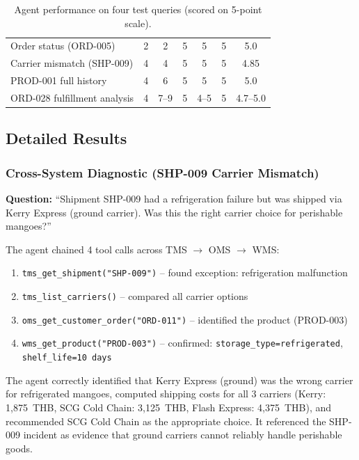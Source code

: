 \documentclass[11pt,a4paper]{article}
\begin{document}
\begin{table}[H]
\centering\small
\caption{Agent performance on four test queries (scored on 5-point scale).}
\begin{tabularx}{\textwidth}{@{} L{3.5cm} c c c c c c @{}}
\toprule
{} &  &  &  &  &  &  \\
\midrule
Order status (ORD-005)              & 2 & 2 & 5 & 5 & 5 & 5.0 \\
Carrier mismatch (SHP-009)          & 4 & 4 & 5 & 5 & 5 & 4.85 \\
PROD-001 full history               & 4 & 6 & 5 & 5 & 5 & 5.0 \\
ORD-028 fulfillment analysis        & 4 & 7--9 & 5 & 4--5 & 5 & 4.7--5.0 \\
\bottomrule
\end{tabularx}
\end{table}

\subsection{Detailed Results}

\subsubsection{Cross-System Diagnostic (SHP-009 Carrier Mismatch)}

\textbf{Question:} ``Shipment SHP-009 had a refrigeration failure but was shipped via Kerry Express (ground carrier). Was this the right carrier choice for perishable mangoes?''

The agent chained 4 tool calls across TMS $\to$ OMS $\to$ WMS:

\begin{enumerate}[nosep]
    \item \texttt{tms\_get\_shipment("SHP-009")} -- found exception: refrigeration malfunction
    \item \texttt{tms\_list\_carriers()} -- compared all carrier options
    \item \texttt{oms\_get\_customer\_order("ORD-011")} -- identified the product (PROD-003)
    \item \texttt{wms\_get\_product("PROD-003")} -- confirmed: \texttt{storage\_type=refrigerated}, \texttt{shelf\_life=10 days}
\end{enumerate}

\begin{resultbox}
The agent correctly identified that Kerry Express (ground) was the wrong carrier for refrigerated mangoes, computed shipping costs for all 3 carriers (Kerry: 1,875~THB, SCG Cold Chain: 3,125~THB, Flash Express: 4,375~THB), and recommended SCG Cold Chain as the appropriate choice. It referenced the SHP-009 incident as evidence that ground carriers cannot reliably handle perishable goods.
\end{resultbox}
\end{document}
